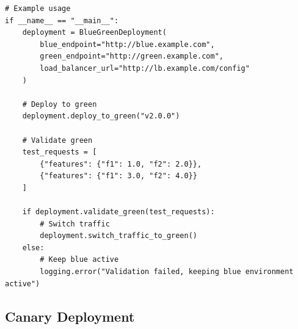 \begin{lstlisting}[style=python, caption={Blue-Green Deployment Controller}]
# Example usage
if __name__ == "__main__":
    deployment = BlueGreenDeployment(
        blue_endpoint="http://blue.example.com",
        green_endpoint="http://green.example.com",
        load_balancer_url="http://lb.example.com/config"
    )

    # Deploy to green
    deployment.deploy_to_green("v2.0.0")

    # Validate green
    test_requests = [
        {"features": {"f1": 1.0, "f2": 2.0}},
        {"features": {"f1": 3.0, "f2": 4.0}}
    ]

    if deployment.validate_green(test_requests):
        # Switch traffic
        deployment.switch_traffic_to_green()
    else:
        # Keep blue active
        logging.error("Validation failed, keeping blue environment active")
\end{lstlisting}

\subsection{Canary Deployment}

